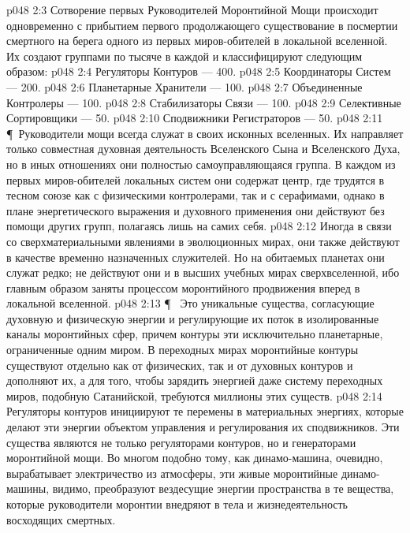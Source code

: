 \vs p048 2:3 Сотворение первых Руководителей Моронтийной Мощи происходит одновременно с прибытием первого продолжающего существование в посмертии смертного на берега одного из первых миров\hyp{}обителей в локальной вселенной. Их создают группами по тысяче в каждой и классифицируют следующим образом:
\vs p048 2:4 \bibnobreakspace Регуляторы Контуров --- 400.
\vs p048 2:5 \bibnobreakspace Координаторы Систем --- 200.
\vs p048 2:6 \bibnobreakspace Планетарные Хранители --- 100.
\vs p048 2:7 \bibnobreakspace Объединенные Контролеры --- 100.
\vs p048 2:8 \bibnobreakspace Стабилизаторы Связи --- 100.
\vs p048 2:9 \bibnobreakspace Селективные Сортировщики --- 50.
\vs p048 2:10 \bibnobreakspace Сподвижники Регистраторов --- 50.
\vs p048 2:11 \P\ Руководители мощи всегда служат в своих исконных вселенных. Их направляет только совместная духовная деятельность Вселенского Сына и Вселенского Духа, но в иных отношениях они полностью самоуправляющаяся группа. В каждом из первых миров\hyp{}обителей локальных систем они содержат центр, где трудятся в тесном союзе как с физическими контролерами, так и с серафимами, однако в плане энергетического выражения и духовного применения они действуют без помощи других групп, полагаясь лишь на самих себя.
\vs p048 2:12 Иногда в связи со сверхматериальными явлениями в эволюционных мирах, они также действуют в качестве временно назначенных служителей. Но на обитаемых планетах они служат редко; не действуют они и в высших учебных мирах сверхвселенной, ибо главным образом заняты процессом моронтийного продвижения вперед в локальной вселенной.
\vs p048 2:13 \P\ \bibnobreakspace {} Это уникальные существа, согласующие духовную и физическую энергии и регулирующие их поток в изолированные каналы моронтийных сфер, причем контуры эти исключительно планетарные, ограниченные одним миром. В переходных мирах моронтийные контуры существуют отдельно как от физических, так и от духовных контуров и дополняют их, а для того, чтобы зарядить энергией даже систему переходных миров, подобную Сатанийской, требуются миллионы этих существ.
\vs p048 2:14 Регуляторы контуров инициируют те перемены в материальных энергиях, которые делают эти энергии объектом управления и регулирования их сподвижников. Эти существа являются не только регуляторами контуров, но и генераторами моронтийной мощи. Во многом подобно тому, как динамо\hyp{}машина, очевидно, вырабатывает электричество из атмосферы, эти живые моронтийные динамо\hyp{}машины, видимо, преобразуют вездесущие энергии пространства в те вещества, которые руководители моронтии внедряют в тела и жизнедеятельность восходящих смертных.
